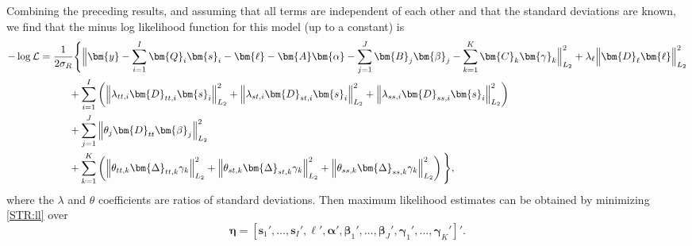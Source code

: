 \documentclass[ijds,nonblindrev]{informs-ijds}
\begin{document}
Combining the preceding results, and assuming that all terms are independent of each other and that the standard deviations are known, we find that the minus log likelihood function for this model (up to a constant) is
\begin{align}
  -\log \mathcal{L} &=
  \frac{1}{2\sigma_R}
  \Bigg\{
    \Big\|\bm{y}- \sum_{i=1}^I \bm{Q}_i\bm{s}_i - \bm{\ell} -
    \bm{A}\bm{\alpha} -
    \sum_{j=1}^{J} \bm{B}_j \bm{\beta}_j -
    \sum_{k=1}^{K} \bm{C}_k \bm{\gamma}_{k}
     \Big\|_{L_2}^2
    + \lambda_\ell\Big\|\bm{D}_\ell \bm{\ell}\Big\|_{L_2}^2\nonumber\\
  & \hspace*{1cm}\mbox{} + \sum_{i=1}^{I}\left(
                  \left\|\lambda_{tt,i} \bm{D}_{tt,i} \bm{s}_i \right\|_{L_2}^2 +
                  \left\|\lambda_{st,i} \bm{D}_{st,i} \bm{s}_i \right\|_{L_2}^2 +
                  \left\|\lambda_{ss,i} \bm{D}_{ss,i} \bm{s}_i \right\|_{L_2}^2 \right)
    \nonumber\\
  & \hspace*{1cm}\mbox{} +
           \sum_{j=1}^{J}\left\|\theta_j \bm{D}_{tt} \bm{\beta}_j\right\|_{L_2}^2
    \nonumber\\
  &  \hspace*{1cm}\mbox{}+ \sum_{k=1}^{K}\left(
      \left\|\theta_{tt,k} \bm{\Delta}_{tt,k} \gamma_k\right\|_{L_2}^2
    + \left\|\theta_{st,k} \bm{\Delta}_{st,k} \gamma_k\right\|_{L_2}^2
    + \left\|\theta_{ss,k} \bm{\Delta}_{ss,k} \gamma_k\right\|_{L_2}^2
    \right)
  \Bigg\},
  \label{STR:ll}
\end{align}
where the \(\lambda\) and \(\theta\) coefficients are ratios of standard deviations. Then maximum likelihood estimates can be obtained by minimizing \eqref{STR:ll} over
\begin{equation}\label{regr:beta}
  \bm{\eta} = [\bm{s}_1', \dots, \bm{s}_I', \bm{\ell}', \bm{\alpha}', \bm{\beta}_1', \dots , \bm{\beta}_J', \bm{\gamma}_1', \dots , \bm{\gamma}_K']'.
\end{equation}
\end{document}
